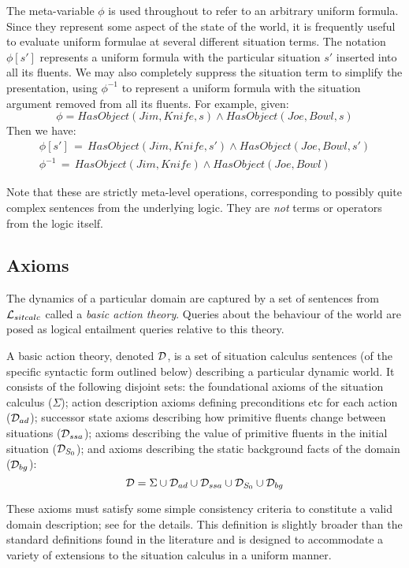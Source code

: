 The meta-variable $\phi$ is used throughout to refer to an arbitrary
uniform formula. Since they represent some aspect of the state of
the world, it is frequently useful to evaluate uniform formulae at
several different situation terms. The notation $\phi[s']$ represents
a uniform formula with the particular situation $s'$ inserted into
all its fluents. We may also completely suppress the situation term
to simplify the presentation, using $\phi^{-1}$ to represent a uniform
formula with the situation argument removed from all its fluents.
For example, given: \[
\phi=HasObject(Jim,Knife,s)\wedge HasObject(Joe,Bowl,s)\]
 Then we have:\begin{gather*}
\phi[s']\,=\, HasObject(Jim,Knife,s')\wedge HasObject(Joe,Bowl,s')\\
\phi^{-1}\,=\, HasObject(Jim,Knife)\wedge HasObject(Joe,Bowl)\end{gather*}


Note that these are strictly meta-level operations, corresponding
to possibly quite complex sentences from the underlying logic. They
are \emph{not} terms or operators from the logic itself.


\subsection{Axioms\label{sec:Background:SC:Axioms}}

The dynamics of a particular domain are captured by a set of sentences
from $\mathcal{L}_{sitcalc}$ called a \emph{basic action theory}. Queries about the
behaviour of the world are posed as logical entailment queries relative
to this theory.

\begin{defnL}
 A basic action theory, denoted
$\mathcal{D}$, is a set of situation calculus sentences (of the specific
syntactic form outlined below) describing a particular dynamic world.
It consists of the following disjoint sets: the foundational axioms
of the situation calculus ($\Sigma$); action description axioms defining
preconditions etc for each action ($\mathcal{D}_{ad}$); successor state axioms
describing how primitive fluents change between situations ($\mathcal{D}_{ssa}$);
axioms describing the value of primitive fluents in the initial situation
($\mathcal{D}_{S_{0}}$); and axioms describing the static background facts
of the domain ($\mathcal{D}_{bg}$):\[
\mathcal{D}=\Sigma\cup\mathcal{D}_{ad}\cup\mathcal{D}_{ssa}\cup\mathcal{D}_{S_{0}}\cup\mathcal{D}_{bg}\]

\end{defnL}
These axioms must satisfy some simple consistency criteria to constitute
a valid domain description; see \citep{pirri99contributions_sitcalc}
for the details. This definition is slightly broader than the standard
definitions found in the literature \citep{levesque98sc_foundations,pirri99contributions_sitcalc,reiter01kia}
and is designed to accommodate a variety of extensions to the situation
calculus in a uniform manner.

